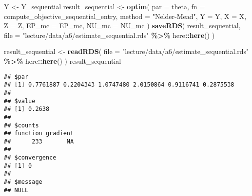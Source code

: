 \documentclass[
]{book}
\newenvironment{Shaded}{\begin{snugshade}}{\end{snugshade}}
\newcommand{\AttributeTok}[1]{\textcolor[rgb]{0.13,0.29,0.53}{#1}}
\newcommand{\FunctionTok}[1]{\textcolor[rgb]{0.13,0.29,0.53}{\textbf{#1}}}
\newcommand{\NormalTok}[1]{#1}
\newcommand{\OtherTok}[1]{\textcolor[rgb]{0.56,0.35,0.01}{#1}}
\newcommand{\SpecialCharTok}[1]{\textcolor[rgb]{0.81,0.36,0.00}{\textbf{#1}}}
\newcommand{\StringTok}[1]{\textcolor[rgb]{0.31,0.60,0.02}{#1}}
\begin{document}
\begin{Shaded}
\begin{Highlighting}[]
\NormalTok{Y }\OtherTok{\textless{}{-}}\NormalTok{ Y\_sequential}
\NormalTok{result\_sequential }\OtherTok{\textless{}{-}}
  \FunctionTok{optim}\NormalTok{(}
        \AttributeTok{par =}\NormalTok{ theta,}
        \AttributeTok{fn =}\NormalTok{ compute\_objective\_sequential\_entry,}
        \AttributeTok{method =} \StringTok{"Nelder{-}Mead"}\NormalTok{,}
        \AttributeTok{Y =}\NormalTok{ Y,}
        \AttributeTok{X =}\NormalTok{ X,}
        \AttributeTok{Z =}\NormalTok{ Z,}
        \AttributeTok{EP\_mc =}\NormalTok{ EP\_mc,}
        \AttributeTok{NU\_mc =}\NormalTok{ NU\_mc}
\NormalTok{        )}
\FunctionTok{saveRDS}\NormalTok{(}
\NormalTok{  result\_sequential, }
  \AttributeTok{file =} \StringTok{"lecture/data/a6/estimate\_sequential.rds"} \SpecialCharTok{\%\textgreater{}\%}\NormalTok{ here}\SpecialCharTok{::}\FunctionTok{here}\NormalTok{()}
\NormalTok{)}
\end{Highlighting}
\end{Shaded}

\begin{Shaded}
\begin{Highlighting}[]
\NormalTok{result\_sequential }\OtherTok{\textless{}{-}} 
  \FunctionTok{readRDS}\NormalTok{(}
    \AttributeTok{file =} \StringTok{"lecture/data/a6/estimate\_sequential.rds"} \SpecialCharTok{\%\textgreater{}\%}\NormalTok{ here}\SpecialCharTok{::}\FunctionTok{here}\NormalTok{()}
\NormalTok{  )}
\NormalTok{result\_sequential}
\end{Highlighting}
\end{Shaded}

\begin{verbatim}
## $par
## [1] 0.7761887 0.2204343 1.0747480 2.0150864 0.9116741 0.2875538
## 
## $value
## [1] 0.2638
## 
## $counts
## function gradient 
##      233       NA 
## 
## $convergence
## [1] 0
## 
## $message
## NULL
\end{verbatim}

\begin{Shaded}
\end{Shaded}
\end{document}
